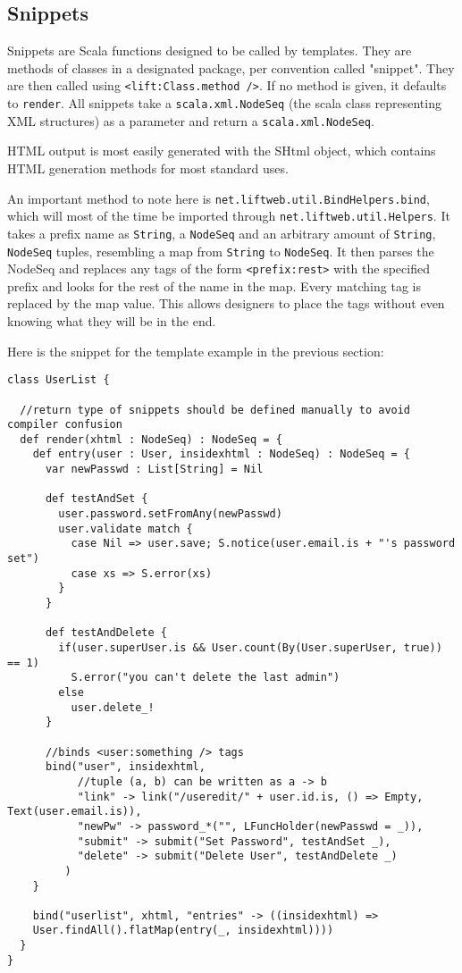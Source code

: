 \subsection{Snippets}

Snippets are Scala functions designed to be called by templates. They are methods of classes in a designated package, per convention called "snippet". They are then called using \lstinline!<lift:Class.method />!. If no method is given, it defaults to \lstinline!render!. All snippets take a \lstinline!scala.xml.NodeSeq! (the scala class representing XML structures) as a parameter and return a \lstinline!scala.xml.NodeSeq!.

HTML output is most easily generated with the SHtml object, which contains HTML generation methods for most standard uses.

An important method to note here is \lstinline!net.liftweb.util.BindHelpers.bind!, which will most of the time be imported through \lstinline!net.liftweb.util.Helpers!. It takes a prefix name as \lstinline!String!, a \lstinline!NodeSeq! and an arbitrary amount of \lstinline!String!, \lstinline!NodeSeq! tuples, resembling a map from \lstinline!String! to \lstinline!NodeSeq!. It then parses the NodeSeq and replaces any tags of the form \lstinline!<prefix:rest>! with the specified prefix and looks for the rest of the name in the map. Every matching tag is replaced by the map value. This allows designers to place the tags without even knowing what they will be in the end.

Here is the snippet for the template example in the previous section:
\begin{lstlisting}[caption=Lift Snippets: UserList.scala,label=lst:lift:snippets]
class UserList {

  //return type of snippets should be defined manually to avoid compiler confusion
  def render(xhtml : NodeSeq) : NodeSeq = {
    def entry(user : User, insidexhtml : NodeSeq) : NodeSeq = {
      var newPasswd : List[String] = Nil

      def testAndSet {
        user.password.setFromAny(newPasswd)
        user.validate match {
          case Nil => user.save; S.notice(user.email.is + "'s password set")
          case xs => S.error(xs)
        }
      }

      def testAndDelete {
        if(user.superUser.is && User.count(By(User.superUser, true)) == 1)
          S.error("you can't delete the last admin")
        else
          user.delete_!
      }

      //binds <user:something /> tags
      bind("user", insidexhtml,
           //tuple (a, b) can be written as a -> b
           "link" -> link("/useredit/" + user.id.is, () => Empty, Text(user.email.is)),
           "newPw" -> password_*("", LFuncHolder(newPasswd = _)),
           "submit" -> submit("Set Password", testAndSet _),
           "delete" -> submit("Delete User", testAndDelete _)
         )
    }

    bind("userlist", xhtml, "entries" -> ((insidexhtml) =>
    User.findAll().flatMap(entry(_, insidexhtml))))
  }
}
\end{lstlisting}


